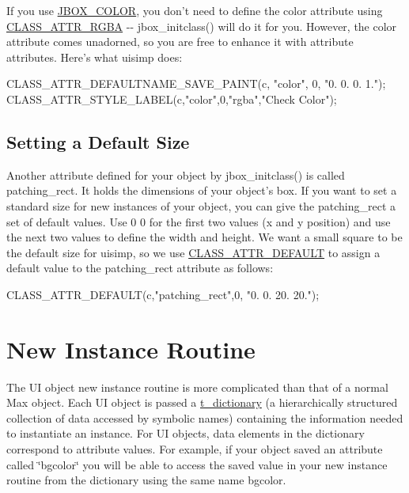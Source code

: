 If you use \hyperlink{group__jbox_ga14cb28210886cfe0df0c34f71338faf8}{JBOX\_\-COLOR}, you don't need to define the color attribute using \hyperlink{group__attr_ga24f3c54d0847a6e117a3a48beb44efac}{CLASS\_\-ATTR\_\-RGBA} -\/-\/ jbox\_\-initclass() will do it for you. However, the color attribute comes unadorned, so you are free to enhance it with attribute attributes. Here's what uisimp does:


\begin{DoxyCode}
    CLASS_ATTR_DEFAULTNAME_SAVE_PAINT(c, "color", 0, "0. 0. 0. 1."); 
    CLASS_ATTR_STYLE_LABEL(c,"color",0,"rgba","Check Color");
\end{DoxyCode}
\hypertarget{chapter_ui_anatomy_chapter_ui_anatomy_attributes_size}{}\subsection{Setting a Default Size}\label{chapter_ui_anatomy_chapter_ui_anatomy_attributes_size}
Another attribute defined for your object by jbox\_\-initclass() is called patching\_\-rect. It holds the dimensions of your object's box. If you want to set a standard size for new instances of your object, you can give the patching\_\-rect a set of default values. Use 0 0 for the first two values (x and y position) and use the next two values to define the width and height. We want a small square to be the default size for uisimp, so we use \hyperlink{group__attr_ga91196b43f49d6769e6fe2df99f5c7c77}{CLASS\_\-ATTR\_\-DEFAULT} to assign a default value to the patching\_\-rect attribute as follows:


\begin{DoxyCode}
    CLASS_ATTR_DEFAULT(c,"patching_rect",0, "0. 0. 20. 20.");
\end{DoxyCode}
\hypertarget{chapter_ui_anatomy_chapter_ui_anatomy_new}{}\section{New Instance Routine}\label{chapter_ui_anatomy_chapter_ui_anatomy_new}
The UI object new instance routine is more complicated than that of a normal Max object. Each UI object is passed a \hyperlink{structt__dictionary}{t\_\-dictionary} (a hierarchically structured collection of data accessed by symbolic names) containing the information needed to instantiate an instance. For UI objects, data elements in the dictionary correspond to attribute values. For example, if your object saved an attribute called \char`\"{}bgcolor\char`\"{} you will be able to access the saved value in your new instance routine from the dictionary using the same name bgcolor.

